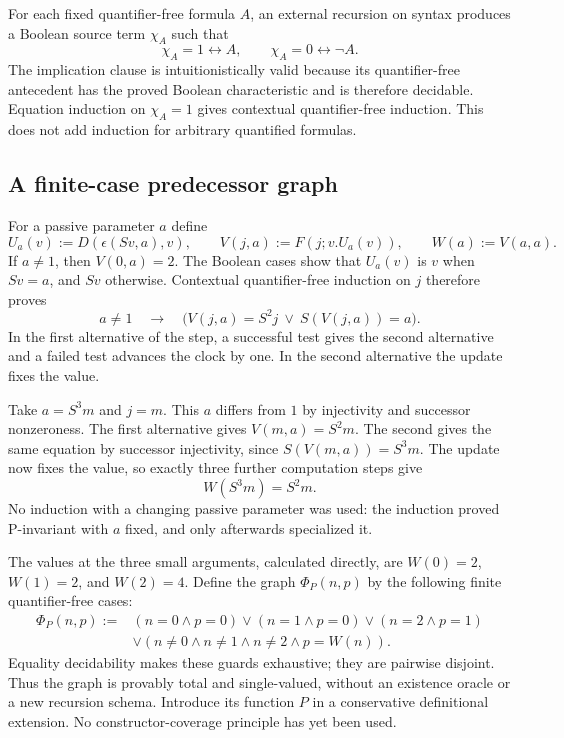 \documentclass[11pt,letterpaper]{article}
\theoremstyle{definition}\newtheorem{definition}[theorem]{Definition}
\theoremstyle{remark}\newtheorem{remark}[theorem]{Remark}
\begin{document}
For each fixed quantifier-free formula $A$, an external recursion on
syntax produces a Boolean source term $\chi_A$ such that
\[
 \chi_A=1\longleftrightarrow A,\qquad
 \chi_A=0\longleftrightarrow\neg A.
\]
The implication clause is intuitionistically valid because its
quantifier-free antecedent has the proved Boolean characteristic and
is therefore decidable. Equation induction on $\chi_A=1$ gives
contextual quantifier-free induction. This does not add induction for
arbitrary quantified formulas.

\subsection{A finite-case predecessor graph}
For a passive parameter $a$ define
\[
 U_a(v):=D(\epsilon(Sv,a),v),\qquad
 V(j,a):=F(j;v.U_a(v)),\qquad W(a):=V(a,a).
\]
If $a\ne1$, then $V(0,a)=2$. The Boolean cases show that $U_a(v)$
is $v$ when $Sv=a$, and $Sv$ otherwise. Contextual quantifier-free
induction on $j$ therefore proves
\[
a\ne1\quad\longrightarrow\quad
\bigl(V(j,a)=S^2j\ \lor\ S(V(j,a))=a\bigr).
\tag{P-invariant}
\]
In the first alternative of the step, a successful test gives the
second alternative and a failed test advances the clock by one. In
the second alternative the update fixes the value.

Take $a=S^3m$ and $j=m$. This $a$ differs from $1$ by injectivity and
successor nonzeroness. The first alternative gives $V(m,a)=S^2m$.
The second gives the same equation by successor injectivity, since
$S(V(m,a))=S^3m$. The update now fixes the value, so exactly three
further computation steps give
\[
                         W(S^3m)=S^2m.\tag{W}
\]
No induction with a changing passive parameter was used: the induction
proved P-invariant with $a$ fixed, and only afterwards specialized it.

The values at the three small arguments, calculated directly, are
$W(0)=2$, $W(1)=2$, and $W(2)=4$. Define the graph $\Phi_P(n,p)$ by
the following finite quantifier-free cases:
\[
\begin{split}
\Phi_P(n,p):={}&(n=0\wedge p=0)\vee(n=1\wedge p=0)
 \vee(n=2\wedge p=1)\\
 &\vee(n\ne0\wedge n\ne1\wedge n\ne2\wedge p=W(n)).
\end{split}
\]
Equality decidability makes these guards exhaustive; they are pairwise
disjoint. Thus the graph is provably total and single-valued, without
an existence oracle or a new recursion schema. Introduce its function
$P$ in a conservative definitional extension. No constructor-coverage
principle has yet been used.
\end{document}

